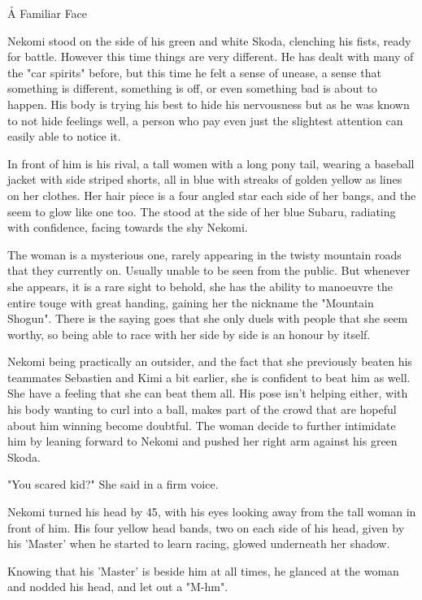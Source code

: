 \h{A Familiar Face}

Nekomi stood on the side of his green and white Skoda, clenching his fists, ready for battle. However this time things are very different. He has dealt with many of the "car spirits" before, but this time he felt a sense of unease, a sense that something is different, something is off, or even something bad is about to happen.
His body is trying his best to hide his nervousness but as he was known to not hide feelings well, a person who pay even just the slightest attention can easily able to notice it.

In front of him is his rival, a tall women with a long pony tail, wearing a baseball jacket with side striped shorts, all in blue with streaks of golden yellow as lines on her clothes.
Her hair piece is a four angled star each side of her bangs, and the seem to glow like one too. The stood at the side of her blue Subaru, radiating with confidence, facing towards the shy Nekomi.

The woman is a mysterious one, rarely appearing in the twisty mountain roads that they currently on.
Usually unable to be seen from the public.
But whenever she appears, it is a rare sight to behold, she has the ability to manoeuvre the entire touge with great handing, gaining her the nickname the "Mountain Shogun". 
There is the saying goes that she only duels with people that she seem worthy, so being able to race with her side by side is an honour by itself.

Nekomi being practically an outsider, and the fact that she previously beaten his teammates Sebastien and Kimi a bit earlier, she is confident to beat him as well.
She have a feeling that she can beat them all. 
His pose isn't helping either, with his body wanting to curl into a ball, makes part of the crowd that are hopeful about him winning become doubtful.
The woman decide to further intimidate him by leaning forward to Nekomi and pushed her right arm against his green Skoda.

"You scared kid?" She said in a firm voice.

Nekomi turned his head by 45\textdegree, with his eyes looking away from the tall woman in front of him. 
His four yellow head bands, two on each side of his head, given by his 'Master' when he started to learn racing, glowed underneath her shadow.

Knowing that his 'Master' is beside him at all times, he glanced at the woman and nodded his head, and let out a "M-hm".

